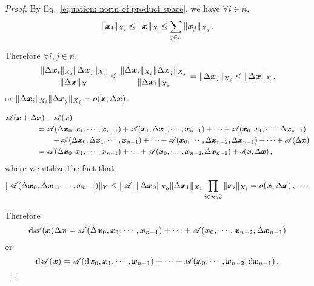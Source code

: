 \documentclass[openany]{book}
\begin{document}
\begin{proof}
	By Eq.~\eqref{equation: norm of product space}, we have $\forall i \in n$,
	\begin{equation*}
		\|\boldsymbol{x}_i\|_{X_i} \leq \|\boldsymbol{x}\|_X 
			\leq \sum_{j \in n} \|\boldsymbol{x}_j\|_{X_j}\,.
	\end{equation*}

	Therefore $\forall i, j \in n$,
	\begin{equation*}
		\frac{\|\Delta \boldsymbol{x}_i\|_{X_i} \|\Delta \boldsymbol{x}_j\|_{X_j}}{\|\Delta \boldsymbol{x}\|_X} 
		\leq \frac{\|\Delta \boldsymbol{x}_i\|_{X_i} \|\Delta \boldsymbol{x}_j\|_{X_j}}{\|\Delta \boldsymbol{x}_i\|_{X_i}} 
			= \|\Delta \boldsymbol{x}_j\|_{X_j} 
		\leq \|\Delta \boldsymbol{x}\|_X\,,
	\end{equation*}
	or $\|\Delta \boldsymbol{x}_i\|_{X_i} \|\Delta \boldsymbol{x}_j\|_{X_j} = o(\boldsymbol{x}; \Delta \boldsymbol{x})$.

	\begin{align*}
		\mathscr A(\boldsymbol{x} + \Delta &\boldsymbol{x}) - \mathscr A(\boldsymbol{x}) 
		\\ & =
		\mathscr A(\Delta \boldsymbol{x}_0, \boldsymbol{x}_1, \cdots, \boldsymbol{x}_{n-1})
			+ \mathscr A(\boldsymbol{x}_1, \Delta \boldsymbol{x}_1, \cdots, \boldsymbol{x}_{n-1})
			+ \cdots
			+ \mathscr A(\boldsymbol{x}_0, \boldsymbol{x}_1, \cdots, \Delta \boldsymbol{x}_{n-1}) 
		\\ & \qquad
			+ \mathscr A(\Delta \boldsymbol{x}_0, \Delta \boldsymbol{x}_1, \cdots, \boldsymbol{x}_{n-1})
			+ \cdots 
			+ \mathscr A(\boldsymbol{x}_0, \cdots, \Delta \boldsymbol{x}_{n-2}, \Delta \boldsymbol{x}_{n-1})
			+ \cdots 
			+ \mathscr A(\Delta \boldsymbol{x})
		\\ & = 
		\mathscr A(\Delta \boldsymbol{x}_0, \boldsymbol{x}_1, \cdots, \boldsymbol{x}_{n-1})
			+ \cdots
			+ \mathscr A(\boldsymbol{x}_0, \cdots, \boldsymbol{x}_{n - 2}, \Delta \boldsymbol{x}_{n-1}) 
			+ o(\boldsymbol{x}; \Delta \boldsymbol{x})\,,
	\end{align*}
	where we utilize the fact that
	\begin{equation*}
		\|\mathscr A(\Delta \boldsymbol{x}_0, \Delta \boldsymbol{x}_1, \cdots, \boldsymbol{x}_{n-1})\|_Y
			\leq \|\mathscr A\| \|\Delta \boldsymbol{x}_0\|_{X_0} \|\Delta \boldsymbol{x}_1\|_{X_1}
				\prod_{i \in n \backslash 2} \|\boldsymbol{x}_i\|_{X_i} = o(\boldsymbol{x}; \Delta \boldsymbol{x})\,,\; \cdots
	\end{equation*}

	Therefore
	\begin{equation*}
		\mathrm{d} \mathscr A(\boldsymbol{x})\Delta \boldsymbol{x}
			= \mathscr A(\Delta \boldsymbol{x}_0, \boldsymbol{x}_1, \cdots, \boldsymbol{x}_{n-1})
				+ \cdots
				+ \mathscr A(\boldsymbol{x}_0, \cdots, \boldsymbol{x}_{n - 2}, \Delta \boldsymbol{x}_{n-1}) 
	\end{equation*}
	or 
	\begin{equation*}
		\mathrm{d} \mathscr A (\boldsymbol{x}) 
			= \mathscr A(\mathrm{d} \boldsymbol{x}_0, \boldsymbol{x}_1, \cdots, \boldsymbol{x}_{n - 1}) + \cdots + \mathscr A(\boldsymbol{x}_0, \cdots, \boldsymbol{x}_{n-2}, \mathrm{d} \boldsymbol{x}_{n-1})\,.
	\end{equation*}

\end{proof}
\end{document}

